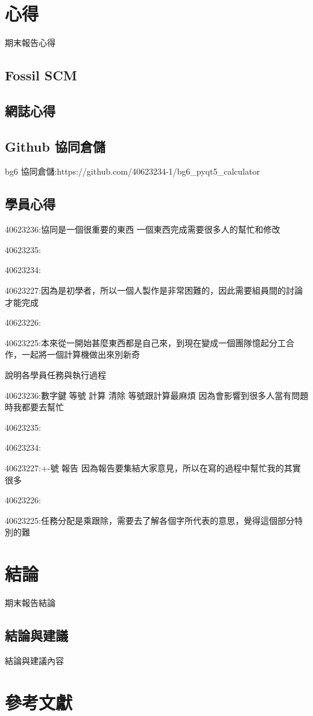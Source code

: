 \documentclass[12pt,,]{report}
\begin{document}
\hypertarget{ux5fc3ux5f97}{%
\chapter{心得}\label{ux5fc3ux5f97}}

期末報告心得

\hypertarget{fossil-scm}{%
\section{Fossil SCM}\label{fossil-scm}}

\hypertarget{ux7db2ux8a8cux5fc3ux5f97}{%
\section{網誌心得}\label{ux7db2ux8a8cux5fc3ux5f97}}

\hypertarget{github-ux5354ux540cux5009ux5132}{%
\section{Github 協同倉儲}\label{github-ux5354ux540cux5009ux5132}}

bg6 協同倉儲:https://github.com/40623234-1/bg6\_pyqt5\_calculator

\hypertarget{ux5b78ux54e1ux5fc3ux5f97}{%
\section{學員心得}\label{ux5b78ux54e1ux5fc3ux5f97}}

40623236:協同是一個很重要的東西 一個東西完成需要很多人的幫忙和修改

40623235:

40623234:

40623227:因為是初學者，所以一個人製作是非常困難的，因此需要組員間的討論才能完成

40623226:

40623225:本來從一開始甚麼東西都是自己來，到現在變成一個團隊憶起分工合作，一起將一個計算機做出來別新奇

說明各學員任務與執行過程

40623236:數字鍵 等號 計算 清除 等號跟計算最麻煩
因為會影響到很多人當有問題時我都要去幫忙

40623235:

40623234:

40623227:+-號 報告
因為報告要集結大家意見，所以在寫的過程中幫忙我的其實很多

40623226:

40623225:任務分配是乘跟除，需要去了解各個字所代表的意思，覺得這個部分特別的難

\hypertarget{ux7d50ux8ad6-1}{%
\chapter{結論}\label{ux7d50ux8ad6-1}}

期末報告結論

\hypertarget{ux7d50ux8ad6ux8207ux5efaux8b70}{%
\section{結論與建議}\label{ux7d50ux8ad6ux8207ux5efaux8b70}}

結論與建議內容

\hypertarget{ux53c3ux8003ux6587ux737b}{%
\chapter{參考文獻}\label{ux53c3ux8003ux6587ux737b}}
\end{document}
